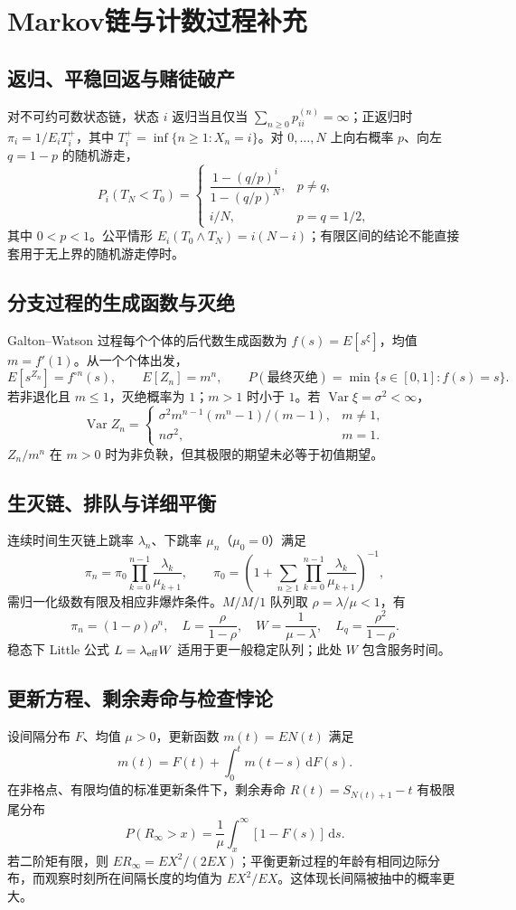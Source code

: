 \documentclass[../main.tex]{subfiles}
\begin{document}
\section{Markov链与计数过程补充}
\subsection{返归、平稳回返与赌徒破产}
对不可约可数状态链，状态 $i$ 返归当且仅当 $\sum_{n\ge0}p_{ii}^{(n)}=\infty$；正返归时 $\pi_i=1/E_iT_i^+$，其中 $T_i^+=\inf\{n\ge1:X_n=i\}$。对 $0,\ldots,N$ 上向右概率 $p$、向左 $q=1-p$ 的随机游走，
\[
P_i(T_N<T_0)=\begin{cases}\dfrac{1-(q/p)^i}{1-(q/p)^N},&p\ne q,\\ i/N,&p=q=1/2,\end{cases}
\]
其中 $0<p<1$。公平情形 $E_i(T_0\wedge T_N)=i(N-i)$；有限区间的结论不能直接套用于无上界的随机游走停时。
\subsection{分支过程的生成函数与灭绝}
Galton--Watson 过程每个个体的后代数生成函数为 $f(s)=E[s^\xi]$，均值 $m=f'(1)$。从一个个体出发，
\[
E[s^{Z_n}]=f^{\circ n}(s),\qquad E[Z_n]=m^n,\qquad
P(\text{最终灭绝})=\min\{s\in[0,1]:f(s)=s\}.
\]
若非退化且 $m\le1$，灭绝概率为 $1$；$m>1$ 时小于 $1$。若 $\operatorname{Var}\xi=\sigma^2<\infty$，
\[
\operatorname{Var}Z_n=\begin{cases}\sigma^2m^{n-1}(m^n-1)/(m-1),&m\ne1,\\n\sigma^2,&m=1.\end{cases}
\]
$Z_n/m^n$ 在 $m>0$ 时为非负鞅，但其极限的期望未必等于初值期望。
\subsection{生灭链、排队与详细平衡}
连续时间生灭链上跳率 $\lambda_n$、下跳率 $\mu_n$（$\mu_0=0$）满足
\[
\pi_n=\pi_0\prod_{k=0}^{n-1}\frac{\lambda_k}{\mu_{k+1}},\qquad
\pi_0=\left(1+\sum_{n\ge1}\prod_{k=0}^{n-1}\frac{\lambda_k}{\mu_{k+1}}\right)^{-1},
\]
需归一化级数有限及相应非爆炸条件。$M/M/1$ 队列取 $\rho=\lambda/\mu<1$，有
\[
\pi_n=(1-\rho)\rho^n,\quad L=\frac\rho{1-\rho},\quad
W=\frac1{\mu-\lambda},\quad L_q=\frac{\rho^2}{1-\rho}.
\]
稳态下 Little 公式 $L=\lambda_{\rm eff}W$ 适用于更一般稳定队列；此处 $W$ 包含服务时间。
\subsection{更新方程、剩余寿命与检查悖论}
设间隔分布 $F$、均值 $\mu>0$，更新函数 $m(t)=EN(t)$ 满足
\[
m(t)=F(t)+\int_0^tm(t-s)\,\mathrm dF(s).
\]
在非格点、有限均值的标准更新条件下，剩余寿命 $R(t)=S_{N(t)+1}-t$ 有极限尾分布
\[
P(R_\infty>x)=\frac1\mu\int_x^\infty[1-F(s)]\,\mathrm ds.
\]
若二阶矩有限，则 $ER_\infty=EX^2/(2EX)$；平衡更新过程的年龄有相同边际分布，而观察时刻所在间隔长度的均值为 $EX^2/EX$。这体现长间隔被抽中的概率更大。
\end{document}
